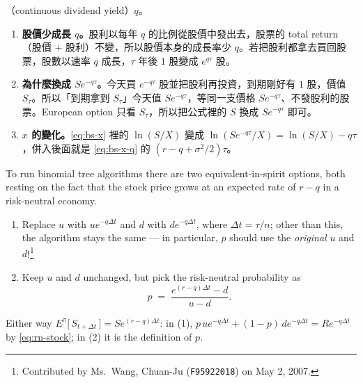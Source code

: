 \begin{remark}
	（continuous dividend yield）$q$。
	\begin{enumerate}[(1),nosep]
		\item \textbf{股價少成長 $q$。}股利以每年 $q$ 的比例從股價中發出去，股票的 total return（股價 $+$ 股利）不變，所以股價本身的成長率少 $q$。若把股利都拿去買回股票，股數以速率 $q$ 成長，$\tau$ 年後 $1$ 股變成 $e^{q\tau}$ 股。
		\item \textbf{為什麼換成 $Se^{-q\tau}$。}今天買 $e^{-q\tau}$ 股並把股利再投資，到期剛好有 $1$ 股，價值 $S_{\tau}$。所以「到期拿到 $S_{\tau}$」今天值 $Se^{-q\tau}$，等同一支價格 $Se^{-q\tau}$、不發股利的股票。European option 只看 $S_{\tau}$，所以把公式裡的 $S$ 換成 $Se^{-q\tau}$ 即可。
		\item \textbf{$x$ 的變化。}\eqref{eq:bs-x} 裡的 $\ln(S/X)$ 變成 $\ln(Se^{-q\tau}/X)=\ln(S/X)-q\tau$，併入後面就是 \eqref{eq:bs-x-q} 的 $(r-q+\sigma^{2}/2)\tau$。
	\end{enumerate}
\end{remark}
\suppend


To run binomial tree algorithms there are two equivalent-in-spirit options, both resting on the fact that the stock price grows at an expected rate of $r-q$ in a risk-neutral economy.
\begin{enumerate}[(1), itemsep=0.3em]
	\item Replace $u$ with $ue^{-q\Delta t}$ and $d$ with $de^{-q\Delta t}$, where $\Delta t=\tau/n$; other than this, the algorithm stays the same --- in particular, $p$ should use the \emph{original} $u$ and $d$!\footnote{Contributed by Ms.~Wang, Chuan-Ju (\texttt{F95922018}) on May 2, 2007.}
	\item Keep $u$ and $d$ unchanged, but pick the risk-neutral probability as
	      \begin{equation}
		      p \;=\; \frac{e^{(r-q)\Delta t}-d}{u-d} .
		      \label{eq:rn-p-yield}
	      \end{equation}
\end{enumerate}
\suppstart
Either way $E^{\pi}\bigl[\,S_{t+\Delta t}\,\bigr]=Se^{(r-q)\Delta t}$: in (1), $p\,ue^{-q\Delta t}+(1-p)\,de^{-q\Delta t}=Re^{-q\Delta t}$ by \eqref{eq:rn-stock}; in (2) it is the definition of $p$.


